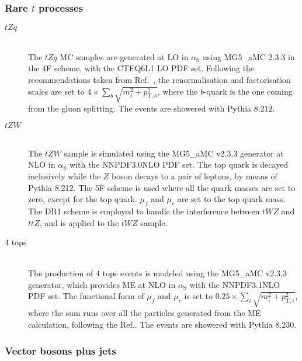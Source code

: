 \subsubsection{Rare $t$ processes}
\label{subsec:RareTopSamples}

\begin{description}
  \item[$tZq$] \mbox{}\\
    The $tZq$ MC samples \cite{TOPQ-2016-14} are generated at LO in $\alpha_{\text{S}}$ using MG5\_aMC 2.3.3 in the 4F scheme, with the CTEQ6L1 \cite{Pumplin:2002vw} LO PDF set. Following the recommendations taken from Ref.~\cite{Frederix:2012dh}, the renormalisation and factorisation scales are set to $4\times\sum_{b}\sqrt{m_{i}^{2}+p_{\text{T},b}^{2}}$, where the $b$-quark is the one coming from the gluon splitting. The events are showered with Pythia 8.212.
  \item[$tZW$] \mbox{}\\
    The $tZW$ sample is simulated using the MG5\_aMC v2.3.3 generator at NLO in $\alpha_{\text{S}}$ with the NNPDF3.0NLO PDF set. The top quark is decayed inclusively while the $Z$ boson decays to a pair of leptons, by means of Pythia 8.212. The 5F scheme is used where all the quark masses are set to zero, except for the top quark. $\mu_{f}$ and $\mu_{r}$ are set to the top quark mass. The DR1 scheme \cite{Frixione:2008yi} is employed to handle the interference between $tWZ$ and $ttZ$, and is applied to the $tWZ$ sample.
  \item[4 tops] \mbox{}\\
    The production of 4 tops events is modeled using the MG5\_aMC v2.3.3 generator, which provides ME at NLO in $\alpha_{\text{S}}$ with the NNPDF3.1NLO PDF set. The functional form of $\mu_{f}$ and $\mu_{r}$ is set to $0.25\times\sum_{i}\sqrt{m_{i}^{2}+p_{\text{T},i}^{2}}$, where the sum runs over all the particles generated from the ME calculation, following the Ref.\cite{Frederix:2017wme}. The events are showered with Pythia 8.230.
\end{description}


\subsubsection{Vector bosons plus jets}
\label{subsec:VplusJetsSamples}

